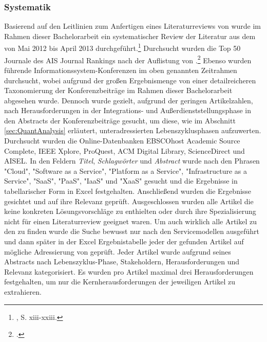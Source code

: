 \subsubsection{Systematik}
\label{sec:Systematik}
Basierend auf den Leitlinien zum Anfertigen eines Literaturreviews von \cite{Webster.2002} wurde im Rahmen dieser Bachelorarbeit ein systematischer Review der Literatur aus dem \TCC von Mai 2012 bis April 2013 durchgeführt.\footnote{\cite{Webster.2002}, S. xiii-xxiii.}
Durchsucht wurden die Top 50 Journale des AIS Journal Rankings nach der Auflistung von \cite{Saunders.2005}.\footnote{\cite{Saunders.2005}.}
Ebenso wurden führende Informationssystem-Konferenzen im oben genannten Zeitrahmen durchsucht, wobei aufgrund der großen Ergebnismenge von einer detailreicheren Taxonomierung der Konferenzbeiträge im Rahmen dieser Bachelorarbeit abgesehen wurde. Dennoch wurde gezielt, aufgrund der geringen Artikelzahlen, nach Herausforderungen in der Integrations- und Außerdienststellungsphase in den Abstracts der Konferenzbeiträge gesucht, um diese, wie im Abschnitt \ref{sec:QuantAnalysis} erläutert, unteradressierten Lebenszyklusphasen aufzuwerten.
\newline
Durchsucht wurden die Online-Datenbanken EBSCOhost Academic Source Complete, IEEE Xplore, ProQuest, ACM Digital Library, ScienceDirect und AISEL. In den Feldern \emph{Titel}, \emph{Schlagwörter} und \emph{Abstract} wurde nach den Phrasen "Cloud", "Software as a Service", "Platform as a Service", "Infrastructure as a Service", "\acs{SaaS}", "\acs{PaaS}", "\acs{IaaS}" und "\acs{XaaS}" gesucht und die Ergebnisse in tabellarischer Form in Excel festgehalten.
Anschließend wurden die Ergebnisse gesichtet und auf ihre Relevanz geprüft. Ausgeschlossen wurden alle Artikel die keine konkreten Lösungsvorschläge zu \HiTCC enthielten oder durch ihre Spezialisierung nicht für einen Literaturreview geeignet waren. 
Um auch wirklich alle Artikel zu den \HiTCC zu finden wurde die Suche bewusst nur nach den Servicemodellen ausgeführt und dann später in der Excel Ergebnistabelle jeder der gefunden Artikel auf mögliche Adressierung von \HiTCC geprüft. Jeder Artikel wurde aufgrund seines Abstracts nach Lebenszyklus-Phase, Stakeholdern, Herausforderungen und Relevanz kategorisiert. Es wurden pro Artikel maximal drei Herausforderungen festgehalten, um nur die Kernherausforderungen der jeweiligen Artikel zu extrahieren.


